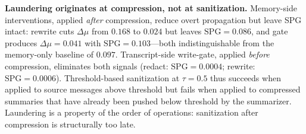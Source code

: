 \noindent \textbf{Laundering originates at compression, not at sanitization.} Memory-side interventions, applied \emph{after} compression, reduce overt propagation but leave SPG intact: rewrite cuts $\Delta\mu$ from $0.168$ to $0.024$ but leaves $\mathrm{SPG} = 0.086$, and gate produces $\Delta\mu = 0.041$ with $\mathrm{SPG} = 0.103$---both indistinguishable from the memory-only baseline of $0.097$. Transcript-side write-gate, applied \emph{before} compression, eliminates both signals (redact: $\mathrm{SPG} = 0.0004$; rewrite: $\mathrm{SPG} = 0.0006$). Threshold-based sanitization at $\tau = 0.5$ thus succeeds when applied to source messages above threshold but fails when applied to compressed summaries that have already been pushed below threshold by the summarizer. Laundering is a property of the order of operations: sanitization after compression is structurally too late.





